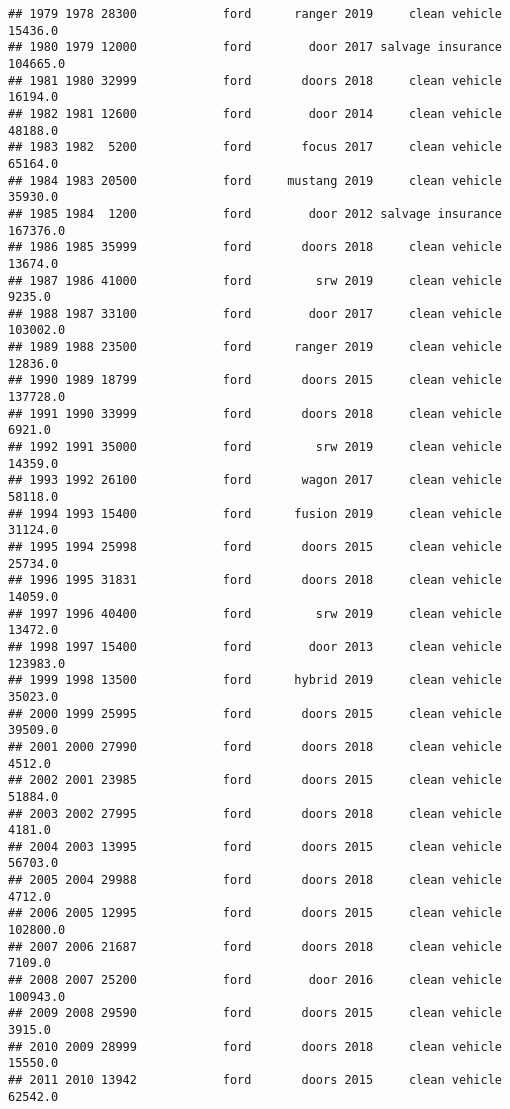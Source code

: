 \documentclass[
]{article}
\begin{document}
\begin{verbatim}
## 1979 1978 28300            ford      ranger 2019     clean vehicle   15436.0
## 1980 1979 12000            ford        door 2017 salvage insurance  104665.0
## 1981 1980 32999            ford       doors 2018     clean vehicle   16194.0
## 1982 1981 12600            ford        door 2014     clean vehicle   48188.0
## 1983 1982  5200            ford       focus 2017     clean vehicle   65164.0
## 1984 1983 20500            ford     mustang 2019     clean vehicle   35930.0
## 1985 1984  1200            ford        door 2012 salvage insurance  167376.0
## 1986 1985 35999            ford       doors 2018     clean vehicle   13674.0
## 1987 1986 41000            ford         srw 2019     clean vehicle    9235.0
## 1988 1987 33100            ford        door 2017     clean vehicle  103002.0
## 1989 1988 23500            ford      ranger 2019     clean vehicle   12836.0
## 1990 1989 18799            ford       doors 2015     clean vehicle  137728.0
## 1991 1990 33999            ford       doors 2018     clean vehicle    6921.0
## 1992 1991 35000            ford         srw 2019     clean vehicle   14359.0
## 1993 1992 26100            ford       wagon 2017     clean vehicle   58118.0
## 1994 1993 15400            ford      fusion 2019     clean vehicle   31124.0
## 1995 1994 25998            ford       doors 2015     clean vehicle   25734.0
## 1996 1995 31831            ford       doors 2018     clean vehicle   14059.0
## 1997 1996 40400            ford         srw 2019     clean vehicle   13472.0
## 1998 1997 15400            ford        door 2013     clean vehicle  123983.0
## 1999 1998 13500            ford      hybrid 2019     clean vehicle   35023.0
## 2000 1999 25995            ford       doors 2015     clean vehicle   39509.0
## 2001 2000 27990            ford       doors 2018     clean vehicle    4512.0
## 2002 2001 23985            ford       doors 2015     clean vehicle   51884.0
## 2003 2002 27995            ford       doors 2018     clean vehicle    4181.0
## 2004 2003 13995            ford       doors 2015     clean vehicle   56703.0
## 2005 2004 29988            ford       doors 2018     clean vehicle    4712.0
## 2006 2005 12995            ford       doors 2015     clean vehicle  102800.0
## 2007 2006 21687            ford       doors 2018     clean vehicle    7109.0
## 2008 2007 25200            ford        door 2016     clean vehicle  100943.0
## 2009 2008 29590            ford       doors 2015     clean vehicle    3915.0
## 2010 2009 28999            ford       doors 2018     clean vehicle   15550.0
## 2011 2010 13942            ford       doors 2015     clean vehicle   62542.0

\end{verbatim}
\end{document}
